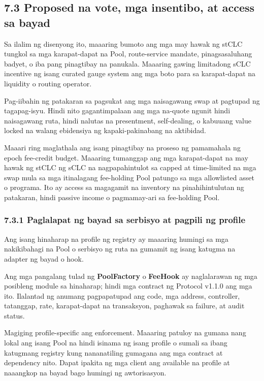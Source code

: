 \documentclass[11pt]{article}
\begin{document}
\subsection*{7.3 Proposed na vote, mga insentibo, at access sa bayad}

Sa ilalim ng disenyong ito, maaaring bumoto ang mga may hawak ng stCLC tungkol sa mga karapat-dapat na Pool, route-service mandate, pinagsasaluhang badyet, o iba pang pinagtibay na panukala. Maaaring gawing limitadong sCLC incentive ng isang curated gauge system ang mga boto para sa karapat-dapat na liquidity o routing operator.

Pag-iibahin ng patakaran sa pagsukat ang mga naisagawang swap at pagtupad ng tagapag-isyu. Hindi nito gagantimpalaan ang mga na-quote ngunit hindi naisagawang ruta, hindi nalutas na presentment, self-dealing, o kabuuang value locked na walang ebidensiya ng kapaki-pakinabang na aktibidad.

Maaari ring maglathala ang isang pinagtibay na proseso ng pamamahala ng epoch fee-credit budget. Maaaring tumanggap ang mga karapat-dapat na may hawak ng stCLC ng sCLC na nagpapahintulot sa capped at time-limited na mga swap mula sa mga itinalagang fee-holding Pool patungo sa mga allowlisted asset o programa. Ito ay access sa magagamit na inventory na pinahihintulutan ng patakaran, hindi passive income o pagmamay-ari sa fee-holding Pool.

\subsubsection*{7.3.1 Paglalapat ng bayad sa serbisyo at pagpili ng profile}

Ang isang hinaharap na profile ng registry ay maaaring humingi sa mga nakikibahagi na Pool o serbisyo ng ruta na gumamit ng isang katugma na adapter ng bayad o hook.

Ang mga pangalang tulad ng \textbf{PoolFactory} o \textbf{FeeHook} ay naglalarawan ng mga posibleng module sa hinaharap; hindi mga contract ng Protocol v1.1.0 ang mga ito. Ilalantad ng anumang pagpapatupad ang code, mga address, controller, tatanggap, rate, karapat-dapat na transaksyon, paghawak sa failure, at audit status.

Magiging profile-specific ang enforcement. Maaaring patuloy na gumana nang lokal ang isang Pool na hindi isinama ng isang profile o sumali sa ibang katugmang registry kung nananatiling gumagana ang mga contract at dependency nito. Dapat ipakita ng mga client ang available na profile at naaangkop na bayad bago humingi ng awtorisasyon.
\end{document}
